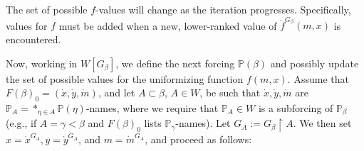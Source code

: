 \documentclass[a4paper,11pt]{article}
\newcommand{\forceP}{\mathbb{P}}
\begin{document}
The set of possible \( f \)-values will change as the iteration progresses. Specifically, values for \( f \) must be added when a new, lower-ranked value of \( \dot{f}^{G_{\beta}}(m, x) \) is encountered. 

Now, working in \( W[G_{\beta}] \), we define the next forcing \( \forceP(\beta) \) and possibly update the set of possible values for the uniformizing function \( f(m, x) \). Assume that \( F(\beta)_0 = (\dot{x}, \dot{y}, \dot{m}) \), and let \( A \subset \beta \), \( A \in W \), be such that \( \dot{x}, \dot{y}, \dot{m} \) are \( \forceP_A = \ast_{\eta \in A} \forceP(\eta) \)-names, where we require that \( \forceP_A \in W \) is a subforcing of \( \forceP_{\beta} \) (e.g., if \( A = \gamma < \beta \) and \( F(\beta)_0 \) lists \( \forceP_{\gamma} \)-names). Let \( G_A := G_{\beta} \upharpoonright A \). We then set \( x = \dot{x}^{G_A}, y = \dot{y}^{G_A} \), and \(m= \dot{m}^{G_A} \), and proceed as follows:
\end{document}
